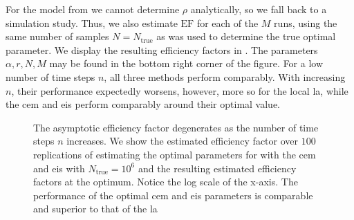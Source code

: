 
For the model from  we cannot determine $\rho$ analytically, so we fall back to a simulation study.
Thus, we also estimate $\text{EF}$ for each of the $M$ runs, using the same number of samples $N = N_{\text{true}}$ as was used to determine the true optimal parameter.
We display the resulting efficiency factors in . The parameters $\alpha, r, N, M$ may be found in the bottom right corner of the figure.
For a low number of time steps $n$, all three methods perform comparably. With increasing $n$, their performance expectedly worsens, however, more so for the local \gls{la}, while the \gls{cem} and \gls{eis} perform comparably around their optimal value. 

\begin{figure}
    \resizebox{\textwidth}{!}{%
    }
    \caption{The asymptotic efficiency factor degenerates as the number of time steps $n$ increases. We show the estimated efficiency factor over $100$ replications of estimating the optimal parameters for  with the \gls{cem} and \gls{eis} with $N_{\text{true}} = 10^{6}$ and the resulting estimated efficiency factors at the optimum. Notice the log scale of the x-axis. The performance of the optimal \gls{cem} and \gls{eis} parameters is comparable and superior to that of the \gls{la}}
    \label{fig:ef_time_dimension}
\end{figure}
